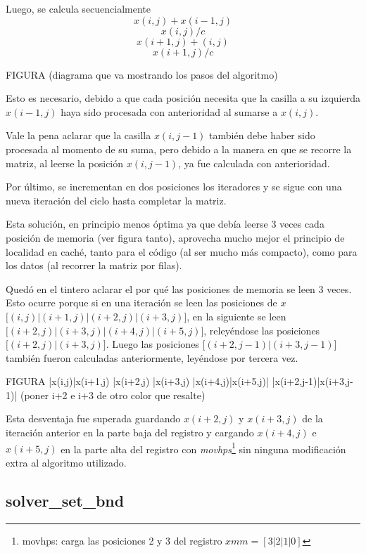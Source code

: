 Luego, se calcula secuencialmente
$$x(i,j) + x(i-1,j)$$
$$x(i,j) / c$$
$$x(i+1,j) + (i,j)$$
$$x(i+1,j) / c$$


FIGURA (diagrama que va mostrando los pasos del algoritmo)

Esto es necesario, debido a que cada posición necesita que la casilla a su
izquierda $x(i-1,j)$ haya sido procesada con anterioridad al sumarse a $x(i,j)$.

Vale la pena aclarar que la casilla $x(i,j-1)$ también debe haber sido procesada al
momento de su suma, pero debido a la manera en que se recorre la matriz, al
leerse la posición $x(i,j-1)$, ya fue calculada con anterioridad.

Por último, se incrementan en dos posiciones los iteradores y se sigue con una
nueva iteración del ciclo hasta completar la matriz.


Esta solución, en principio menos óptima ya que debía leerse 3 veces cada
posición de memoria (ver figura tanto), aprovecha mucho mejor el principio de
localidad en caché, tanto para el código (al ser mucho más compacto), como para
los datos (al recorrer la matriz por filas).

Quedó en el tintero aclarar el por qué las posiciones de memoria se leen 3
veces. Esto ocurre porque si en una iteración se leen las posiciones de $x$
$\bigl[(i,j)|(i+1,j)|(i+2,j)|(i+3,j)\bigr]$, en la siguiente se leen
$\bigl[(i+2,j)|(i+3,j)|(i+4,j)|(i+5,j)\bigr]$, releyéndose las posiciones
$\bigl[(i+2,j)|(i+3,j)\bigr]$. Luego las posiciones
$\bigl[(i+2,j-1)|(i+3,j-1)\bigr]$ también fueron calculadas anteriormente,
leyéndose por tercera vez.

FIGURA |x(i,j)|x(i+1,j)  |x(i+2,j)  |x(i+3,j)  |x(i+4,j)|x(i+5,j)|
                         |x(i+2,j-1)|x(i+3,j-1)|
(poner i+2 e i+3 de otro color que resalte)

Esta desventaja fue superada guardando $x(i+2,j)$ y $x(i+3,j)$ de la iteración
anterior en la parte baja del registro y cargando $x(i+4,j)$ e $x(i+5,j)$ en la parte
alta del registro con {\it movhps\/}\footnote{movhps: carga las posiciones 2 y 3
del registro $xmm = [3|2|1|0]$} sin ninguna modificación extra al algoritmo utilizado.



\subsection{solver_set_bnd}

